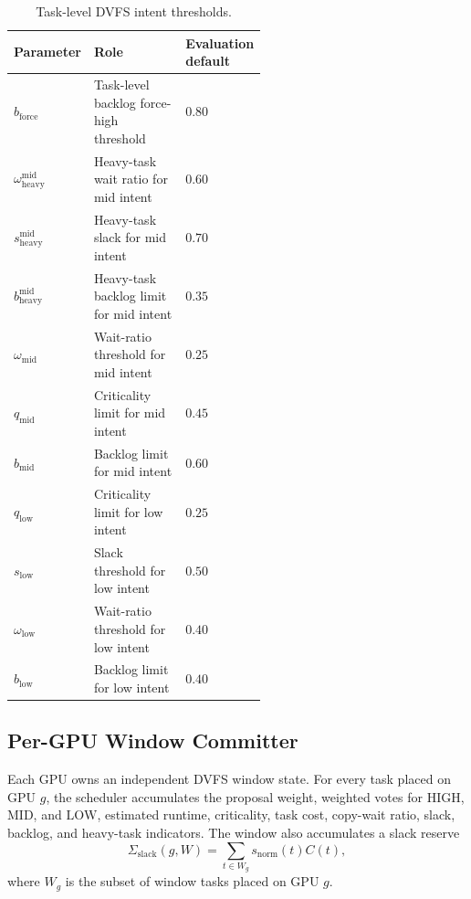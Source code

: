 \begin{table}[t]
\centering
\footnotesize
\begin{tabular}{@{}lp{0.55\linewidth}l@{}}
\toprule
Parameter & Role & Evaluation default \\
\midrule
$b_{\mathrm{force}}$ & Task-level backlog force-high threshold & $0.80$ \\
$\omega_{\mathrm{heavy}}^{\mathrm{mid}}$ & Heavy-task wait ratio for mid intent & $0.60$ \\
$s_{\mathrm{heavy}}^{\mathrm{mid}}$ & Heavy-task slack for mid intent & $0.70$ \\
$b_{\mathrm{heavy}}^{\mathrm{mid}}$ & Heavy-task backlog limit for mid intent & $0.35$ \\
$\omega_{\mathrm{mid}}$ & Wait-ratio threshold for mid intent & $0.25$ \\
$q_{\mathrm{mid}}$ & Criticality limit for mid intent & $0.45$ \\
$b_{\mathrm{mid}}$ & Backlog limit for mid intent & $0.60$ \\
$q_{\mathrm{low}}$ & Criticality limit for low intent & $0.25$ \\
$s_{\mathrm{low}}$ & Slack threshold for low intent & $0.50$ \\
$\omega_{\mathrm{low}}$ & Wait-ratio threshold for low intent & $0.40$ \\
$b_{\mathrm{low}}$ & Backlog limit for low intent & $0.40$ \\
\bottomrule
\end{tabular}
\caption{Task-level DVFS intent thresholds.}
\label{tab:dvfs-intent-thresholds}
\end{table}

\subsection{Per-GPU Window Committer}
\label{subsec:methods-dvfs-committer}

Each GPU owns an independent DVFS window state. For every task placed on GPU $g$, the scheduler accumulates the proposal weight, weighted votes for $\mathrm{HIGH}$, $\mathrm{MID}$, and $\mathrm{LOW}$, estimated runtime, criticality, task cost, copy-wait ratio, slack, backlog, and heavy-task indicators. The window also accumulates a slack reserve
\begin{equation}
\Sigma_{\mathrm{slack}}(g,W)=\sum_{t\in W_g}s_{\mathrm{norm}}(t)C(t),
\end{equation}
where $W_g$ is the subset of window tasks placed on GPU $g$.

